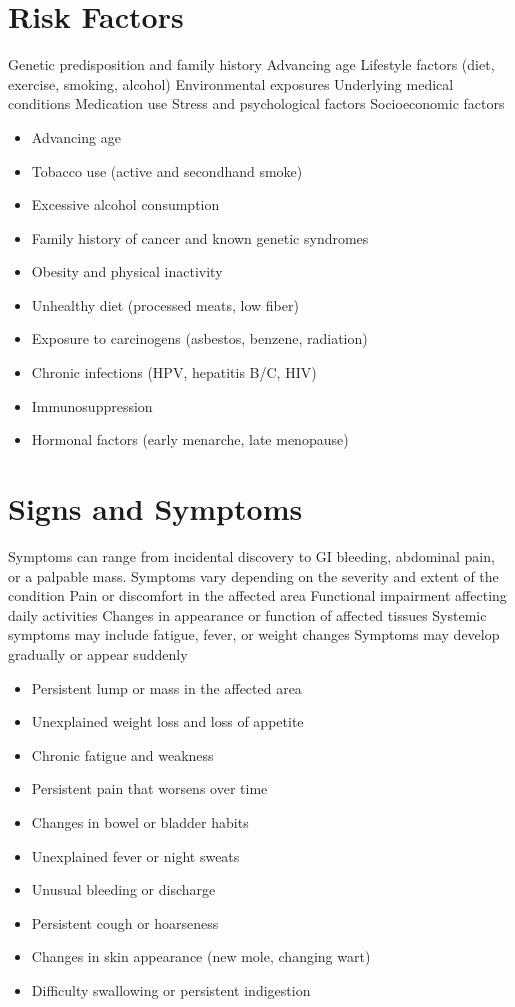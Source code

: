 \section{Risk Factors}
Genetic predisposition and family history Advancing age Lifestyle factors (diet, exercise, smoking, alcohol) Environmental exposures Underlying medical conditions Medication use Stress and psychological factors Socioeconomic factors

\begin{itemize}[noitemsep]
  \item Advancing age
  \item Tobacco use (active and secondhand smoke)
  \item Excessive alcohol consumption
  \item Family history of cancer and known genetic syndromes
  \item Obesity and physical inactivity
  \item Unhealthy diet (processed meats, low fiber)
  \item Exposure to carcinogens (asbestos, benzene, radiation)
  \item Chronic infections (HPV, hepatitis B/C, HIV)
  \item Immunosuppression
  \item Hormonal factors (early menarche, late menopause)
\end{itemize}
\section{Signs and Symptoms}
Symptoms can range from incidental discovery to GI bleeding, abdominal pain, or a palpable mass. Symptoms vary depending on the severity and extent of the condition Pain or discomfort in the affected area Functional impairment affecting daily activities Changes in appearance or function of affected tissues Systemic symptoms may include fatigue, fever, or weight changes Symptoms may develop gradually or appear suddenly

\begin{itemize}[noitemsep]
  \item Persistent lump or mass in the affected area
  \item Unexplained weight loss and loss of appetite
  \item Chronic fatigue and weakness
  \item Persistent pain that worsens over time
  \item Changes in bowel or bladder habits
  \item Unexplained fever or night sweats
  \item Unusual bleeding or discharge
  \item Persistent cough or hoarseness
  \item Changes in skin appearance (new mole, changing wart)
  \item Difficulty swallowing or persistent indigestion
\end{itemize}
